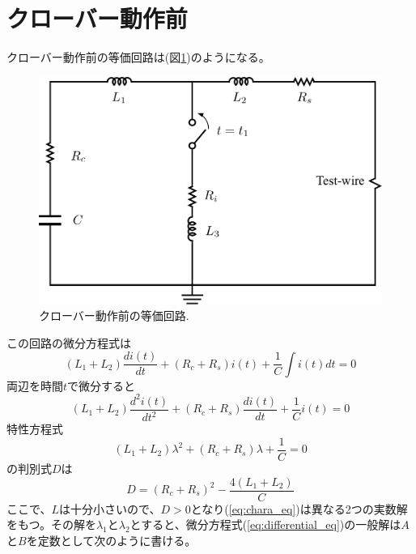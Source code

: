 \documentclass[book,openany]{jlreq}
\theoremstyle{definition}
\begin{document}
\clearpage

\section{クローバー動作前}

クローバー動作前の等価回路は(図\ref{fig:BeforeCrowbar})のようになる。

\begin{figure}[htbp]
  \begin{center}
    \includegraphics[width=12cm]{figs/BeforeCRB.pdf}
    \caption{クローバー動作前の等価回路.}
    \label{fig:BeforeCrowbar}
  \end{center}
\end{figure}
%
この回路の微分方程式は
%
\begin{equation}
  (L_1+L_2) \frac{di(t)}{dt} + (R_c+R_s) i(t) + \frac{1}{C} \int i(t) dt = 0
\end{equation}
%
両辺を時間$t$で微分すると
%
\begin{equation}
  (L_1+L_2)\frac{d^2i(t)}{dt^2} + (R_c+R_s) \frac{di(t)}{dt} + \frac{1}{C} i(t) = 0
  \label{eq:differential_eq}
\end{equation}
%
特性方程式
%
\begin{equation}
  (L_1+L_2)\lambda^2 + (R_c+R_s)  \lambda + \frac{1}{C} = 0
  \label{eq:chara_eq}
\end{equation}
%
の判別式$D$は
%
\begin{equation}
  D = (R_c+R_s)^2 -\frac{4 (L_1+L_2)}{C}
\end{equation}
%
ここで、$L$は十分小さいので、$D>0$となり(\ref{eq:chara_eq})は異なる2つの実数解をもつ。その解を$\lambda_1$と$\lambda_2$とすると、微分方程式(\ref{eq:differential_eq})の一般解は$A$と$B$を定数として次のように書ける。
\end{document}
